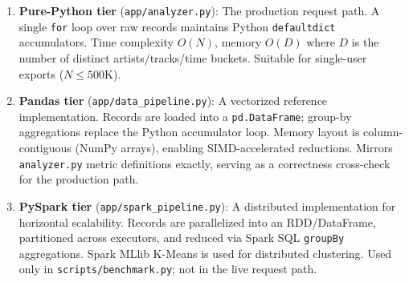 \documentclass[conference]{IEEEtran}
\begin{document}
\begin{enumerate}
  \item \textbf{Pure-Python tier} (\texttt{app/analyzer.py}): The production
        request path. A single \texttt{for} loop over raw records maintains
        Python \texttt{defaultdict} accumulators. Time complexity $O(N)$,
        memory $O(D)$ where $D$ is the number of distinct artists/tracks/time
        buckets. Suitable for single-user exports ($N \leq 500\text{K}$).
  \item \textbf{Pandas tier} (\texttt{app/data\_pipeline.py}): A vectorized
        reference implementation. Records are loaded into a \texttt{pd.DataFrame};
        group-by aggregations replace the Python accumulator loop. Memory layout
        is column-contiguous (NumPy arrays), enabling SIMD-accelerated reductions.
        Mirrors \texttt{analyzer.py} metric definitions exactly, serving as a
        correctness cross-check for the production path.
  \item \textbf{PySpark tier} (\texttt{app/spark\_pipeline.py}): A distributed
        implementation for horizontal scalability. Records are parallelized into
        an RDD/DataFrame, partitioned across executors, and reduced via
        Spark SQL \texttt{groupBy} aggregations. Spark MLlib K-Means is used for
        distributed clustering. Used only in \texttt{scripts/benchmark.py}; not
        in the live request path.
\end{enumerate}
\end{document}
